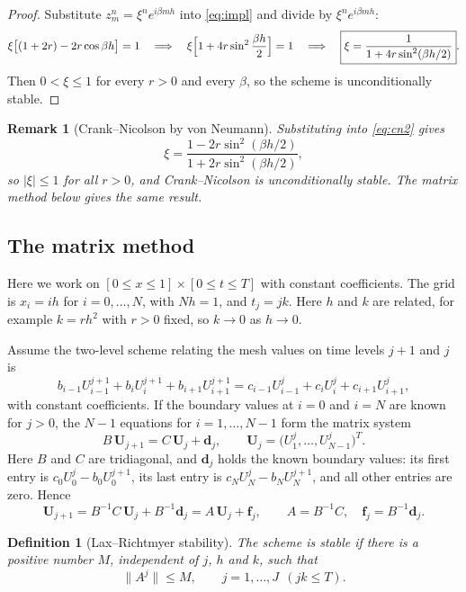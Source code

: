 \documentclass[11pt,a4paper]{article}
\numberwithin{equation}{section}
\theoremstyle{spacedplain}
\theoremstyle{spaceddefinition}
\newtheorem{definition}[theorem]{Definition}
\theoremstyle{spacedremark}
\newtheorem{remark}[theorem]{Remark}
\begin{document}
\begin{proof}
Substitute \(z_m^n=\xi^ne^{i\beta mh}\) into \eqref{eq:impl} and divide
by \(\xi^ne^{i\beta mh}\):
\[
  \xi\bigl[(1+2r)-2r\cos\beta h\bigr]=1
  \quad\Longrightarrow\quad
  \xi\Bigl[1+4r\sin^2\frac{\beta h}2\Bigr]=1
  \quad\Longrightarrow\quad
  \boxed{\xi=\frac{1}{1+4r\sin^2(\beta h/2)}}.
\]
Then \(0<\xi\le1\) for every \(r>0\) and every \(\beta\), so the scheme
is unconditionally stable.
\end{proof}

\begin{remark}[Crank--Nicolson by von Neumann]
Substituting into \eqref{eq:cn2} gives
\[
  \xi=\frac{1-2r\sin^2(\beta h/2)}{1+2r\sin^2(\beta h/2)},
\]
so \(|\xi|\le1\) for all \(r>0\), and Crank--Nicolson is
unconditionally stable.  The matrix method below gives the same
result.
\end{remark}

\subsection{The matrix method}

Here we work on \([0\le x\le1]\times[0\le t\le T]\) with constant
coefficients.  The grid is \(x_i=ih\) for \(i=0,\dots,N\), with
\(Nh=1\), and \(t_j=jk\).  Here \(h\) and \(k\) are related, for example
\(k=rh^2\) with \(r>0\) fixed, so \(k\to0\) as \(h\to0\).

Assume the two-level scheme relating the mesh values on time levels
\(j+1\) and \(j\) is
\[
  b_{i-1}U_{i-1}^{j+1}+b_iU_i^{j+1}+b_{i+1}U_{i+1}^{j+1}
  =c_{i-1}U_{i-1}^j+c_iU_i^j+c_{i+1}U_{i+1}^j,
\]
with constant coefficients.  If the boundary values at \(i=0\) and
\(i=N\) are known for \(j>0\), the \(N-1\) equations for
\(i=1,\dots,N-1\) form the matrix system
\[
  B\,\mathbf U_{j+1}=C\,\mathbf U_j+\mathbf d_j,
  \qquad \mathbf U_j=\bigl(U_1^j,\dots,U_{N-1}^j\bigr)^T.
\]
Here \(B\) and \(C\) are tridiagonal, and \(\mathbf d_j\) holds the
known boundary values: its first entry is \(c_0U_0^j-b_0U_0^{j+1}\), its
last entry is \(c_NU_N^j-b_NU_N^{j+1}\), and all other entries are zero.
Hence
\[
  \mathbf U_{j+1}=B^{-1}C\,\mathbf U_j+B^{-1}\mathbf d_j
  =A\,\mathbf U_j+\mathbf f_j,
  \qquad A=B^{-1}C,\quad \mathbf f_j=B^{-1}\mathbf d_j.
\]

\begin{definition}[Lax--Richtmyer stability]
The scheme is \emph{stable} if there is a positive number \(M\),
independent of \(j\), \(h\) and \(k\), such that
\[
  \|A^j\|\le M,\qquad j=1,\dots,J\ \ (jk\le T).
\]
\end{definition}
\end{document}
